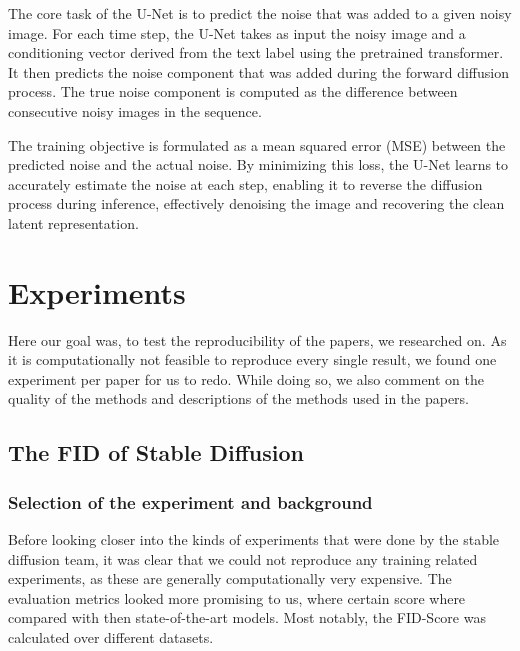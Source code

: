 \documentclass[11pt]{article}
\begin{document}
The core task of the U-Net is to predict the noise that was added to a given noisy image. For each time step, the U-Net takes as input the noisy image and a conditioning vector derived from the text label using the pretrained transformer. It then predicts the noise component that was added during the forward diffusion process. The true noise component is computed as the difference between consecutive noisy images in the sequence.

The training objective is formulated as a mean squared error (MSE) between the predicted noise and the actual noise. By minimizing this loss, the U-Net learns to accurately estimate the noise at each step, enabling it to reverse the diffusion process during inference, effectively denoising the image and recovering the clean latent representation.





\newpage
\section{Experiments}
Here our goal was, to test the reproducibility of the papers, we researched on. As it is computationally not feasible to reproduce every single result, we found one experiment per paper for us to redo. While doing so, we also comment on the quality of the methods and descriptions of the methods used in the papers.

\subsection{The FID of Stable Diffusion}
\subsubsection{Selection of the experiment and background}
\label{sec:experiments:stabel_diffusion:selction_of_fid}
Before looking closer into the kinds of experiments that were done by the stable diffusion team, it was clear that we could not reproduce any training related experiments, as these are generally computationally very expensive. The evaluation metrics looked more promising to us, where certain score where compared with then state-of-the-art models. Most notably, the FID-Score was calculated over different datasets.
\end{document}

